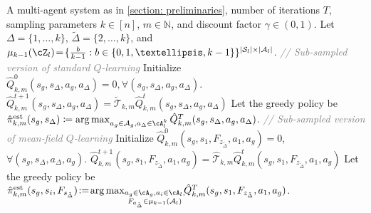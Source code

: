 \documentclass{article}
\newcommand{\Comment}[1]{\textcolor{gray}{\footnotesize\textit{// #1}}}
\theoremstyle{plain}
\theoremstyle{definition}
\def\est{\mathrm{est}}
\DeclareMathOperator*{\argmax}{arg\,max}
\begin{document}
\begin{algorithm}[t]
\caption{\texttt{SUB-SAMPLE-MFQ}: Learning }\label{algorithm: approx-dense-tolerable-Q-learning-exp}
\begin{algorithmic}[1]
\REQUIRE A multi-agent system as in \cref{section: preliminaries}, number of iterations $T$, sampling parameters $k\in[n]$, $m\in\mathbb{N}$, and discount factor $\gamma\in (0,1)$. 
\STATE Let $\Delta=\{1,\dots,k\}$, $\tilde{\Delta}=\{2,\dots,k\}$, and  $\mu_{k-1}(\cZ_l)\!=\!\{\frac{b}{k-1}: b\in\{0,1,\dots,k-1\}\}^{|\mathcal{S}_l|\times|\mathcal{A}_l|}$.
\STATE \Comment{Sub-sampled version of standard $Q$-learning}
\STATE Initialize $\hat{Q}^0_{k,m}(s_g, s_\Delta, a_g,a_\Delta)= 0, \forall (s_g,s_\Delta,a_g,a_\Delta)$.
\STATE \!\!$\hat{Q}^{t+1}_{k,m}
(s_g, s_\Delta, a_g,a_\Delta)\!=\!\tilde{\mathcal{T}}_{k,m}\hat{Q}^t_{k,m}(s_g, s_\Delta, a_g, a_\Delta)$\!\! 
\ENDFOR
\ENDFOR
\STATE Let the greedy policy be $\hat{\pi}_{k,m}^\est(s_g,s_\Delta)\coloneqq \arg\max_{\substack{a_g\in\mathcal{A}_g, a_\Delta\in\cA_l^k}} \hat{Q}_{k,m}^T(s_g,s_\Delta,a_g,a_\Delta)$.
\ELSE{}
\STATE \Comment{Sub-sampled version of mean-field $Q$-learning}
\STATE Initialize $\hat{Q}^0_{k,m}(s_g,s_1, F_{z_{\tilde{\Delta}}}, a_1, a_g)=0$, $\forall(s_g,s_{\Delta},a_\Delta,a_g)$.
\STATE $\hat{Q}^{t+1}_{k,m}(s_g,s_1, F_{z_{\tilde{\Delta}}}, a_1,a_g)= \hat{\mathcal{T}}_{k,m} \hat{Q}^t_{k,m}(s_g,s_1, F_{z_{\tilde{\Delta}}}, a_1,a_g)$
\ENDFOR
\ENDFOR
\STATE Let the greedy policy be $\hat{\pi}_{k,m}^\est(s_g,s_i, F_{s_{\tilde{\Delta}}})\!:=\!
\argmax_{\substack{a_g\in\cA_g,a_i\in\cA_l,\\ F_{a_{\tilde{\Delta}}}\in\mu_{k-1}{(\mathcal{A}_l)}}}\!\!\hat{Q}_{k,m}^T(s_g,s_1, F_{z_{\tilde{\Delta}}}, a_1,a_g)$.
\ENDIF

\end{algorithmic}
\end{algorithm}
\end{document}
